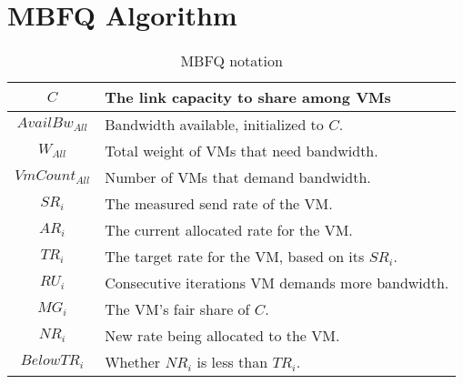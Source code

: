 \section{MBFQ Algorithm}
\label{sec:algorithm}

\begin{table}[t]
{\footnotesize
\begin{tabular}{ | c | p{6cm} | }
  \hline
  $C$ & The link capacity to share among VMs \\ \hline
  $AvailBw_{All}$ & Bandwidth available, initialized to $C$. \\ \hline
  $W_{All}$ & Total weight of VMs that need bandwidth. \\ \hline
  $VmCount_{All}$ & Number of VMs that demand bandwidth. \\ \hline 
  $SR_{i}$ & The measured send rate of the VM. \\ \hline
  $AR_{i}$ & The current allocated rate for the VM. \\ \hline
  $TR_{i}$ & The target rate for the VM, based on its $SR_{i}$. \\ \hline
  $RU_{i}$ & Consecutive iterations VM demands more bandwidth. \\ \hline
  $MG_{i} $ & The VM's fair share of $C$. \\ \hline
  $NR_{i}$ & New rate being allocated to the VM.   \\ \hline
  $BelowTR_{i}$ & Whether $NR_{i}$ is less than $TR_{i}$. \\ \hline
\end{tabular}
}
\vspace{-1em}
\caption{MBFQ notation}
\vspace{-1em}
\label{tab:mbfq_init}
\end{table}

